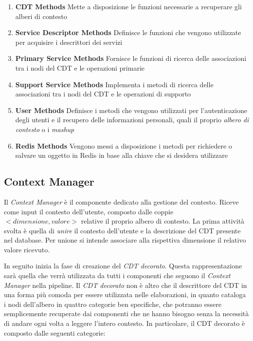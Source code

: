 \begin{enumerate}
	\item \textbf{CDT Methods} Mette a disposizione le funzioni necessarie a recuperare gli alberi di contesto
	\item \textbf{Service Descriptor Methods} Definisce le funzioni che vengono utilizzate per acquisire i descrittori dei servizi
	\item \textbf{Primary Service Methods} Fornisce le funzioni di ricerca delle associazioni tra i nodi del CDT e le operazioni primarie
	\item \textbf{Support Service Methods} Implementa i metodi di ricerca delle associazioni tra i nodi del CDT e le operazioni di supporto
	\item \textbf{User Methods} Definisce i metodi che vengono utilizzati per l'autenticazione degli utenti e il recupero delle informazioni personali, quali il proprio \emph{albero di contesto} o i \emph{mashup}
	\item \textbf{Redis Methods} Vengono messi a disposizione i metodi per richiedere o salvare un oggetto in Redis in base alla chiave che si desidera utilizzare
\end{enumerate}

\subsection{Context Manager\label{sec:context-manager}}

Il \emph{Context Manager} è il componente dedicato alla gestione del contesto. Riceve come input il contesto dell'utente, composto dalle coppie $ {<}dimensione, valore{>} $ relative il proprio albero di contesto. La prima attività svolta è quella di \emph{unire} il contesto dell'utente e la descrizione del CDT presente nel database. Per unione si intende associare alla rispettiva dimensione il relativo valore ricevuto.

In seguito inizia la fase di creazione del \emph{CDT decorato}. Questa rappresentazione sarà quella che verrà utilizzata da tutti i componenti che seguono il \emph{Context Manager} nella pipeline. Il \emph{CDT decorato} non è altro che il descrittore del CDT in una forma più comoda per essere utilizzata nelle elaborazioni, in quanto cataloga i nodi dell'albero in quattro categorie ben specifiche, che potranno essere semplicemente recuperate dai componenti che ne hanno bisogno senza la necessità di andare ogni volta a leggere l'intero contesto. In particolare, il CDT decorato è composto dalle seguenti categorie:

